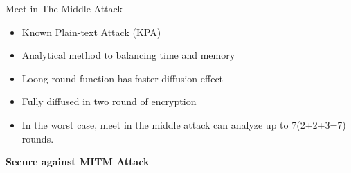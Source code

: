 \begin{frame}{Meet-in-The-Middle Attack}
    \begin{itemize}
        \item Known Plain-text Attack (KPA)
        \pause
        \item Analytical method to balancing time and memory
        \pause
        \item Loong round function has faster diffusion effect
        \pause
        \item Fully diffused in two round of encryption
        \pause
        \item In the worst case, meet in the middle attack can analyze up to 7(2+2+3=7) rounds.
    \end{itemize}
    \vspace{1cm}
    \textbf{Secure against MITM Attack}
\end{frame}